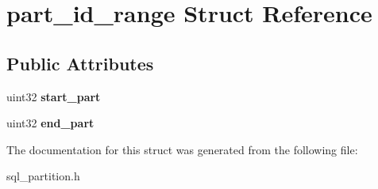 \hypertarget{structpart__id__range}{}\section{part\+\_\+id\+\_\+range Struct Reference}
\label{structpart__id__range}
\subsection*{Public Attributes}
\begin{DoxyCompactItemize}
\item 
\mbox{\label{structpart__id__range_a37b3f8f6b4e97079ad5dd02ece48694d}} 
uint32 {\bfseries start\+\_\+part}
\item 
\mbox{\label{structpart__id__range_a7a7526e29f99eaac7a315d1b5a4cdadd}} 
uint32 {\bfseries end\+\_\+part}
\end{DoxyCompactItemize}


The documentation for this struct was generated from the following file\+:\begin{DoxyCompactItemize}
\item 
sql\+\_\+partition.\+h\end{DoxyCompactItemize}
